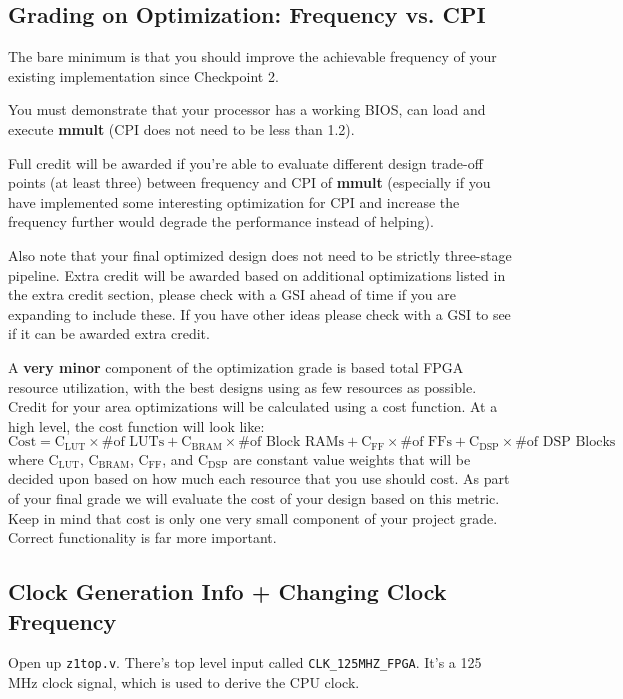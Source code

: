 \documentclass[11pt]{article}
\begin{document}
\subsection{Grading on Optimization: Frequency vs. CPI}
The bare minimum is that you should improve the achievable frequency of your existing implementation since Checkpoint 2.

You must demonstrate that your processor has a working BIOS, can load and execute \textbf{mmult} (CPI does not need to be less than 1.2).

Full credit will be awarded if you're able to evaluate different design trade-off points (at least three) between frequency and CPI of \textbf{mmult} (especially if you have implemented some interesting optimization for CPI and increase the frequency further would degrade the performance instead of helping).

Also note that your final optimized design does not need to be strictly three-stage pipeline. Extra credit will be awarded based on additional optimizations listed in the extra credit section, please check with a GSI ahead of time if you are expanding to include these. If you have other ideas please check with a GSI to see if it can be awarded extra credit.

A \textbf{very minor} component of the optimization grade is based total FPGA resource utilization, with the best designs using as few resources as possible.
Credit for your area optimizations will be calculated using a cost function.
At a high level, the cost function will look like:
\begin{equation*}
\mathrm{Cost}=\mathrm{C_{LUT}} \times \text{\# of LUTs} + \mathrm{C_{BRAM}} \times \text{\# of Block RAMs} + \mathrm{C_{FF}} \times \text{\# of FFs} + \mathrm{C_{DSP}} \times \text{\# of DSP Blocks}
\end{equation*}
where $\mathrm{C_{LUT}}$, $\mathrm{C_{BRAM}}$, $\mathrm{C_{FF}}$, and $\mathrm{C_{DSP}}$ are constant value weights that will be decided upon based on how much each resource that you use should cost. As part of your final grade we will evaluate the cost of your design based on this metric. Keep in mind that cost is only one very small component of your project grade. Correct functionality is far more important.

\subsection{Clock Generation Info + Changing Clock Frequency}
Open up \verb|z1top.v|.
There's top level input called \verb|CLK_125MHZ_FPGA|.
It's a 125 MHz clock signal, which is used to derive the CPU clock.
\end{document}
